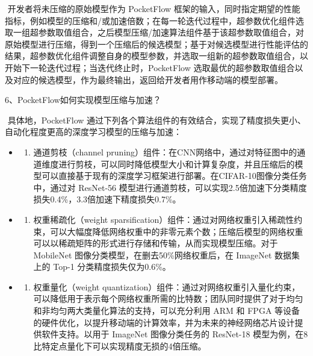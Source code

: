 ​ 开发者将未压缩的原始模型作为 PocketFlow
框架的输入，同时指定期望的性能指标，例如模型的压缩和/或加速倍数；在每一轮迭代过程中，超参数优化组件选取一组超参数取值组合，之后模型压缩/加速算法组件基于该超参数取值组合，对原始模型进行压缩，得到一个压缩后的候选模型；基于对候选模型进行性能评估的结果，超参数优化组件调整自身的模型参数，并选取一组新的超参数取值组合，以开始下一轮迭代过程；当迭代终止时，PocketFlow
选取最优的超参数取值组合以及对应的候选模型，作为最终输出，返回给开发者用作移动端的模型部署。

6、PocketFlow如何实现模型压缩与加速？

​ 具体地，PocketFlow
通过下列各个算法组件的有效结合，实现了精度损失更小、自动化程度更高的深度学习模型的压缩与加速：

\begin{itemize}
\item
  \begin{enumerate}
  \def\labelenumi{\alph{enumi})}
  \item
    通道剪枝（channel
    pruning）组件：在CNN网络中，通过对特征图中的通道维度进行剪枝，可以同时降低模型大小和计算复杂度，并且压缩后的模型可以直接基于现有的深度学习框架进行部署。在CIFAR-10图像分类任务中，通过对
    ResNet-56
    模型进行通道剪枝，可以实现2.5倍加速下分类精度损失0.4\%，3.3倍加速下精度损失0.7\%。
  \end{enumerate}
\item
  \begin{enumerate}
  \def\labelenumi{\alph{enumi})}
  \setcounter{enumi}{1}
  \item
    权重稀疏化（weight
    sparsification）组件：通过对网络权重引入稀疏性约束，可以大幅度降低网络权重中的非零元素个数；压缩后模型的网络权重可以以稀疏矩阵的形式进行存储和传输，从而实现模型压缩。对于
    MobileNet 图像分类模型，在删去50\%网络权重后，在 ImageNet 数据集上的
    Top-1 分类精度损失仅为0.6\%。
  \end{enumerate}
\item
  \begin{enumerate}
  \def\labelenumi{\alph{enumi})}
  \setcounter{enumi}{2}
  \item
    权重量化（weight
    quantization）组件：通过对网络权重引入量化约束，可以降低用于表示每个网络权重所需的比特数；团队同时提供了对于均匀和非均匀两大类量化算法的支持，可以充分利用
    ARM 和 FPGA
    等设备的硬件优化，以提升移动端的计算效率，并为未来的神经网络芯片设计提供软件支持。以用于
    ImageNet 图像分类任务的 ResNet-18
    模型为例，在8比特定点量化下可以实现精度无损的4倍压缩。

\end{enumerate}
\end{itemize}
